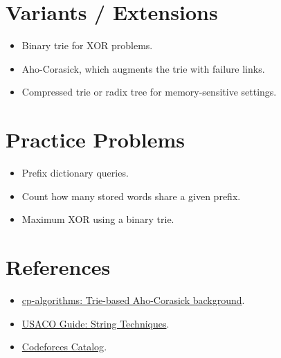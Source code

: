 \section*{Variants / Extensions}

\begin{itemize}
  \item Binary trie for XOR problems.
  \item Aho-Corasick, which augments the trie with failure links.
  \item Compressed trie or radix tree for memory-sensitive settings.
\end{itemize}

\section*{Practice Problems}

\begin{itemize}
  \item Prefix dictionary queries.
  \item Count how many stored words share a given prefix.
  \item Maximum XOR using a binary trie.
\end{itemize}

\section*{References}

\begin{itemize}
  \item \href{https://cp-algorithms.com/string/aho_corasick.html}{cp-algorithms: Trie-based Aho-Corasick background}.
  \item \href{https://usaco.guide/gold/strings}{USACO Guide: String Techniques}.
  \item \href{https://codeforces.com/catalog}{Codeforces Catalog}.
\end{itemize}
